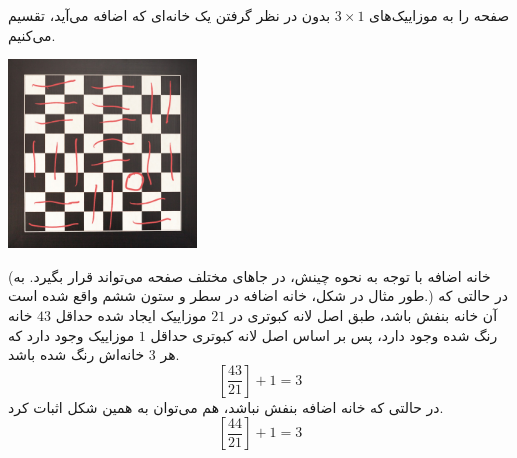 صفحه را به موزاییک‌های $3\times1$ بدون در نظر گرفتن یک خانه‌ای که اضافه می‌آید، تقسیم می‌کنیم. 
	\p
\begin{center}
    \includegraphics[height=5cm]{Q3Pic.jpg}
\end{center}
(خانه اضافه با توجه به نحوه چینش‌، در جاهای مختلف صفحه می‌تواند قرار بگیرد. به طور مثال در شکل، خانه اضافه در سطر و ستون ششم واقع شده است.)
	\p
 در حالتی که آن خانه بنفش باشد، طبق اصل لانه کبوتری در
$21$ 
موزاییک ایجاد شده حداقل
$43$
خانه رنگ شده وجود دارد، پس بر اساس اصل لانه کبوتری حداقل 
$1$
موزاییک وجود دارد که هر 
$3$ 
خانه‌اش رنگ شده باشد.
\[[\frac {43} {21}]+1=3\]  
در حالتی که خانه اضافه بنفش نباشد، هم می‌توان به همین شکل اثبات کرد.
\[[\frac {44} {21}]+1=3\]  